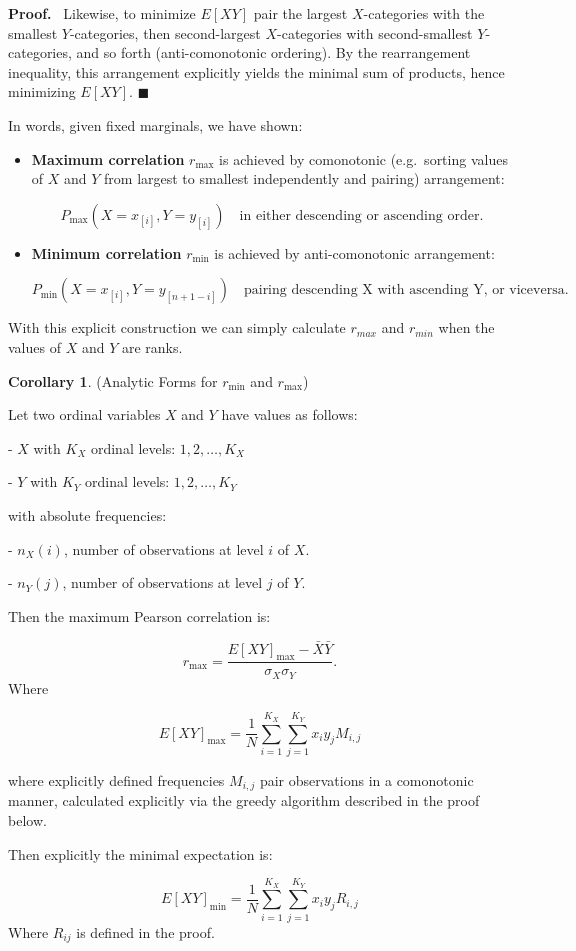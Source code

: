 \documentclass[
  12pt,
]{article}
\theoremstyle{plain}
\theoremstyle{definition}
\newtheorem{corollary}{Corollary}
\renewenvironment{proof}
   {\par\noindent\textbf{Proof.}\ }
   {\hfill$\blacksquare$\par}
\theoremstyle{remark}
\begin{document}
\begin{proof}
Likewise, to minimize \(E[XY]\) pair the largest \(X\)-categories with
the smallest \(Y\)-categories, then second-largest \(X\)-categories with
second-smallest \(Y\)-categories, and so forth (anti-comonotonic
ordering). By the rearrangement inequality, this arrangement explicitly
yields the minimal sum of products, hence minimizing \(E[XY]\).
\end{proof}

In words, given fixed marginals, we have shown:

\begin{itemize}
\item
  \textbf{Maximum correlation} \(r_{\text{max}}\) is achieved by
  comonotonic (e.g.~sorting values of \(X\) and \(Y\) from largest to
  smallest independently and pairing) arrangement:

  \[P_{\text{max}}(X=x_{[i]}, Y=y_{[i]}) \quad\text{in either descending or ascending order.}\]
\item
  \textbf{Minimum correlation} \(r_{\text{min}}\) is achieved by
  anti-comonotonic arrangement:

  \[P_{\text{min}}(X=x_{[i]}, Y=y_{[n+1-i]}) \quad\text{pairing descending X with ascending Y, or viceversa.}\]
\end{itemize}

With this explicit construction we can simply calculate \(r_{max}\) and
\(r_{min}\) when the values of \(X\) and \(Y\) are ranks.

\label{corr-min}
\begin{corollary} {(Analytic Forms for $r_{\min}$ and $r_{\max}$)}


Let two ordinal variables $X$ and $Y$ have values as follows:

- $X$ with $K_X$ ordinal levels: $1,2,\dots,K_X$
    
- $Y$ with $K_Y$ ordinal levels: $1,2,\dots,K_Y$
    
with absolute frequencies:

- $n_{X}(i)$, number of observations at level $i$ of $X$.
    
- $n_{Y}(j)$, number of observations at level $j$ of $Y$.
    

Then the maximum Pearson correlation is:

$$r_{\text{max}} = \frac{E[XY]_{\text{max}} - \bar{X}\bar{Y}}{\sigma_X \sigma_Y}.$$
Where 

$$
E[XY]_{\max} =\frac{1}{N}\sum_{i=1}^{K_X}\sum_{j=1}^{K_Y}x_i y_j M_{i,j}
$$

where explicitly defined frequencies $M_{i,j}$ pair observations in a comonotonic manner, calculated explicitly via the greedy algorithm described in the proof below.


Then explicitly the minimal expectation is:

$$E[XY]_{\text{min}}=\frac{1}{N}\sum_{i=1}^{K_X}\sum_{j=1}^{K_Y} x_i y_j R_{i,j}$$
Where $R_{ij}$ is defined in the proof.
\end{corollary}
\end{document}
